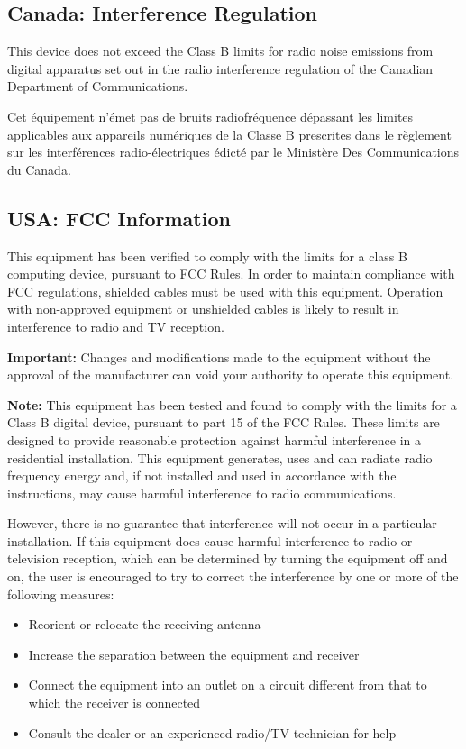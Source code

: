 \documentclass{scrartcl}
\begin{document}
\pagebreak

\subsection{Canada: Interference Regulation}
This device does not exceed the Class B limits for radio noise emissions from digital apparatus set out in the radio interference regulation of the Canadian Department of Communications.

Cet équipement n’émet pas de bruits radiofréquence dépassant les limites applicables aux appareils numériques de la Classe B prescrites dans le règlement sur les interférences radio-électriques édicté par le Ministère Des Communications du Canada.

\subsection{USA: FCC Information}

This equipment has been verified to comply with the limits for a class B computing device, pursuant to FCC Rules. In order to maintain compliance with FCC regulations, shielded cables must be used with this equipment. Operation with non-approved equipment or unshielded cables is likely to result in interference to radio and TV reception.

\textbf{Important:} Changes and modifications made to the equipment without the approval of the manufacturer can void your authority to operate this equipment.

\textbf{Note:} This equipment has been tested and found to comply with the limits for a Class B digital device, pursuant to part 15 of the FCC Rules. These limits are designed to provide reasonable protection against harmful interference in a residential installation. This equipment generates, uses and can radiate radio frequency energy and, if not installed and used in accordance with the instructions, may cause harmful interference to radio communications.

However, there is no guarantee that interference will not occur in a particular installation. If this equipment does cause harmful interference to radio or television reception, which can be determined by turning the equipment off and on, the user is encouraged to try to correct the interference by one or more of the following measures:

\begin{itemize}
    \item Reorient or relocate the receiving antenna
    \item Increase the separation between the equipment and receiver
    \item Connect the equipment into an outlet on a circuit different from that to which the receiver is connected
    \item Consult the dealer or an experienced radio/TV technician for help
\end{itemize}
\end{document}
